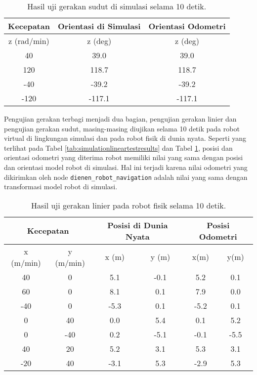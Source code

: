 \begin{table}
  \caption{Hasil uji gerakan sudut di simulasi selama 10 detik.}
  \label{tab:simulationangulartestresults}
  \centering
  \begin{tabular}{c|c|c}
    \toprule
    Kecepatan   & Orientasi di Simulasi & Orientasi Odometri \\
    \midrule
    z (rad/min) & z (deg)               & z (deg) \\
    \midrule
    40          & 39.0                  & 39.0 \\
    120         & 118.7                 & 118.7 \\
    -40         & -39.2                 & -39.2 \\
    -120        & -117.1                & -117.1 \\
    \bottomrule
  \end{tabular}
\end{table}

Pengujian gerakan terbagi menjadi dua bagian,
  pengujian gerakan linier dan pengujian gerakan sudut,
  masing-masing diujikan selama 10 detik pada robot virtual di lingkungan simulasi dan pada robot fisik di dunia nyata.
Seperti yang terlihat pada Tabel \ref{tab:simulationlineartestresults} dan Tabel \ref{tab:simulationangulartestresults},
  posisi dan orientasi odometri yang diterima robot memiliki nilai yang sama dengan posisi dan orientasi model robot di simulasi.
Hal ini terjadi karena nilai odometri yang dikirimkan oleh node \lstinline{dienen_robot_navigation} adalah nilai yang sama dengan transformasi model robot di simulasi.

\begin{table}
  \caption{Hasil uji gerakan linier pada robot fisik selama 10 detik.}
  \label{tab:realrobotlineartestresults}
  \centering
  \begin{tabular}{cc|cc|cc}
    \toprule
    \multicolumn{2}{c|}{Kecepatan} &
    \multicolumn{2}{|c|}{Posisi di Dunia Nyata} &
    \multicolumn{2}{|c}{Posisi Odometri} \\
    \midrule
    x (m/min) & y (m/min) & x (m) & y (m) & x(m)  & y(m) \\
    \midrule
    40        & 0         & 5.1   & -0.1  & 5.2   & 0.1 \\
    60        & 0         & 8.1   & 0.1   & 7.9   & 0.0 \\
    -40       & 0         & -5.3  & 0.1   & -5.2  & 0.1 \\
    0         & 40        & 0.0   & 5.4   & 0.1   & 5.2 \\
    0         & -40       & 0.2   & -5.1  & -0.1  & -5.5 \\
    40        & 20        & 5.2   & 3.1   & 5.3   & 3.1 \\
    -20       & 40        & -3.1  & 5.3   & -2.9  & 5.3 \\
    \bottomrule
  \end{tabular}
\end{table}

